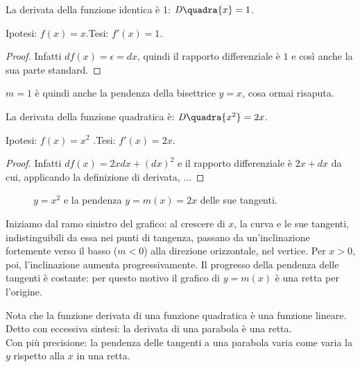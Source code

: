 \begin{teorema}
  La derivata della funzione identica è 1: $\mathit{D}\quadra{x}=1$.
\end{teorema}
\noindent Ipotesi: $f(x)=x$.\tab Tesi: $f'(x)=1$.
\begin{proof}
 Infatti $df(x)=\epsilon=dx$, quindi il rapporto differenziale è $1$ e così
 anche la sua parte standard.
\end{proof}
\begin{osservazione}
 $m=1$ è quindi anche la pendenza della bisettrice $y=x$, cosa ormai 
risaputa.
\end{osservazione}

\begin{teorema}
  La derivata della funzione quadratica è: $\mathit{D}\quadra{x^2}=2x$.
\end{teorema}
\noindent Ipotesi: $f(x)=x^2$ .\tab Tesi: $f'(x)=2x$.
\begin{proof}
  Infatti $df(x)=2xdx+(dx)^2$ e il rapporto differenziale è $2x+dx$ da cui,
  applicando la definizione di derivata, ...
\end{proof}

\begin{figure}[h!]
\begin{inaccessibleblock}
 \begin{center}
 \begin{minipage}[]{.48\textwidth}
 \parabola
 \end{minipage} 
 \hfill
 \begin{minipage}[]{.48\textwidth}
  \tangentiparabola
 \end{minipage}
 \end{center}
\end{inaccessibleblock}
\caption{$y=x^2$ e la pendenza $y=m(x)=2x$ delle sue tangenti.} 
\label{}
\end{figure}

Iniziamo dal ramo sinistro del grafico: al crescere di $x$, la curva e le 
sue 
tangenti, indistinguibili da essa nei punti di tangenza, passano
da un'inclinazione fortemente verso il basso ($m<0$) alla direzione 
orizzontale,
nel vertice. Per $x>0$, poi, l'inclinazione aumenta progressivamente. Il 
progresso della pendenza delle tangenti è costante: per questo motivo il 
grafico di $y=m(x)$ è una retta per l'origine.

\begin{osservazione}
Nota che la funzione derivata di una funzione quadratica è una funzione 
lineare. Detto con eccessiva sintesi: la derivata di una parabola è una 
retta.\\
Con più precisione: la pendenza delle tangenti a una parabola
varia come varia la $y$ rispetto alla $x$ in una retta.
\end{osservazione}

